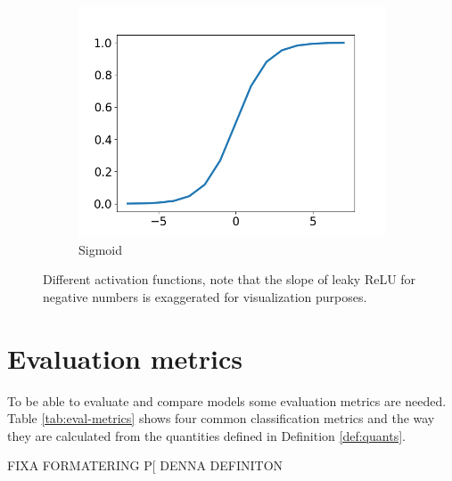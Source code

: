 \begin{figure}
\begin{subfigure}[t]{0.3\textwidth}
    \includegraphics[width=\textwidth]{files/figs/sigmoid.png}
    \caption{Sigmoid}
    \label{fig:sigmoid}
  \end{subfigure}
  \caption{Different activation functions, note that the slope of leaky ReLU for negative numbers is exaggerated for visualization purposes. }
  \label{fig:activations}
\end{figure}


\section{Evaluation metrics}
To be able to evaluate and compare models some evaluation metrics are needed. Table \ref{tab:eval-metrics} shows four common classification metrics and the way they are calculated from the quantities defined in Definition \ref{def:quants}.


FIXA FORMATERING P[ DENNA DEFINITON
\begin{definition}
   \\
   \\
   \\
  \label{def:quants}
\end{definition}

